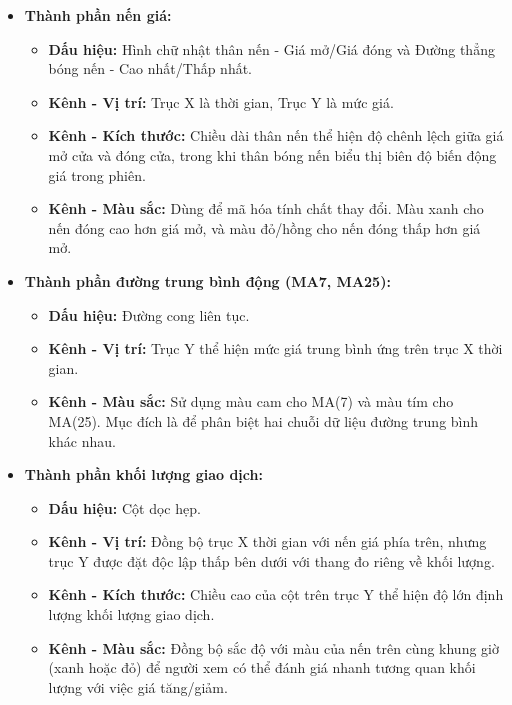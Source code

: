 \begin{itemize}
    \item \textbf{Thành phần nến giá:}
    \begin{itemize}
        \item \textbf{Dấu hiệu:} Hình chữ nhật thân nến - Giá mở/Giá đóng và Đường thẳng bóng nến - Cao nhất/Thấp nhất.
        \item \textbf{Kênh - Vị trí:} Trục X là thời gian, Trục Y là mức giá.
        \item \textbf{Kênh - Kích thước:} Chiều dài thân nến thể hiện độ chênh lệch giữa giá mở cửa và đóng cửa, trong khi thân bóng nến biểu thị biên độ biến động giá trong phiên.
        \item \textbf{Kênh - Màu sắc:} Dùng để mã hóa tính chất thay đổi. Màu xanh cho nến đóng cao hơn giá mở, và màu đỏ/hồng cho nến đóng thấp hơn giá mở.
    \end{itemize}
    
    \item \textbf{Thành phần đường trung bình động (MA7, MA25):}
    \begin{itemize}
        \item \textbf{Dấu hiệu:} Đường cong liên tục.
        \item \textbf{Kênh - Vị trí:} Trục Y thể hiện mức giá trung bình ứng trên trục X thời gian.
        \item \textbf{Kênh - Màu sắc:} Sử dụng màu cam cho MA(7) và màu tím cho MA(25). Mục đích là để phân biệt hai chuỗi dữ liệu đường trung bình khác nhau.
    \end{itemize}

    \item \textbf{Thành phần khối lượng giao dịch:}
    \begin{itemize}
        \item \textbf{Dấu hiệu:} Cột dọc hẹp.
        \item \textbf{Kênh - Vị trí:} Đồng bộ trục X thời gian với nến giá phía trên, nhưng trục Y được đặt độc lập thấp bên dưới với thang đo riêng về khối lượng.
        \item \textbf{Kênh - Kích thước:} Chiều cao của cột trên trục Y thể hiện độ lớn định lượng khối lượng giao dịch.
        \item \textbf{Kênh - Màu sắc:} Đồng bộ sắc độ với màu của nến trên cùng khung giờ (xanh hoặc đỏ) để người xem có thể đánh giá nhanh tương quan khối lượng với việc giá tăng/giảm.
    \end{itemize}
\end{itemize}

